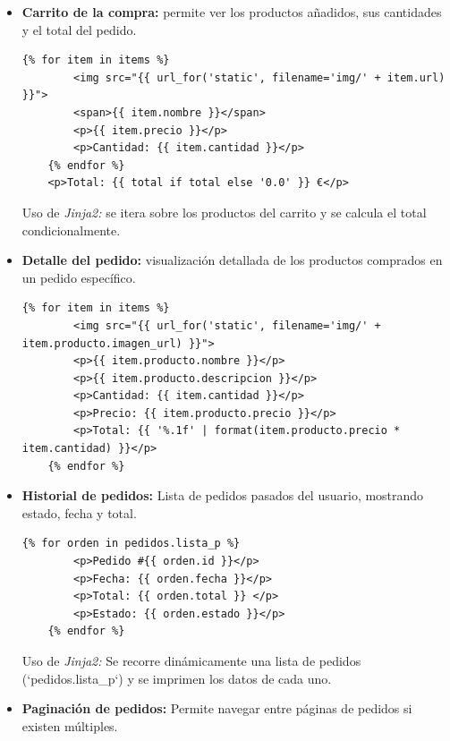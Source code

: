 \documentclass[10pt]{book}
\begin{document}
\begin{itemize}
    Uso de \textit{Jinja2:} muestra los atributos de un único objeto `producto`.

    \item \textbf{Carrito de la compra:} permite ver los productos añadidos, sus cantidades y el total del pedido.

    \begin{lstlisting}[style=bonitoJinja]
    {% for item in items %}
        <img src="{{ url_for('static', filename='img/' + item.url) }}">
        <span>{{ item.nombre }}</span>
        <p>{{ item.precio }}</p>
        <p>Cantidad: {{ item.cantidad }}</p>
    {% endfor %}
    <p>Total: {{ total if total else '0.0' }} €</p>
    \end{lstlisting}

    Uso de \textit{Jinja2:} se itera sobre los productos del carrito y se calcula el total condicionalmente.

    \item \textbf{Detalle del pedido:} visualización detallada de los productos comprados en un pedido específico.

    \begin{lstlisting}[style=bonitoJinja]
    {% for item in items %}
        <img src="{{ url_for('static', filename='img/' + item.producto.imagen_url) }}">
        <p>{{ item.producto.nombre }}</p>
        <p>{{ item.producto.descripcion }}</p>
        <p>Cantidad: {{ item.cantidad }}</p>
        <p>Precio: {{ item.producto.precio }}</p>
        <p>Total: {{ '%.1f' | format(item.producto.precio * item.cantidad) }}</p>
    {% endfor %}
    \end{lstlisting}

  
    \item \textbf{Historial de pedidos:} Lista de pedidos pasados del usuario, mostrando estado, fecha y total.
    
    \begin{lstlisting}[style=bonitoJinja]
    {% for orden in pedidos.lista_p %}
        <p>Pedido #{{ orden.id }}</p>
        <p>Fecha: {{ orden.fecha }}</p>
        <p>Total: {{ orden.total }} </p>
        <p>Estado: {{ orden.estado }}</p>
    {% endfor %}
    \end{lstlisting}
    
    Uso de \textit{Jinja2:} Se recorre dinámicamente una lista de pedidos (`pedidos.lista\_p`) y se imprimen los datos de cada uno.
    

    \item \textbf{Paginación de pedidos:} Permite navegar entre páginas de pedidos si existen múltiples.
    

\end{itemize}
\end{document}
